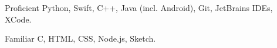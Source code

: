 
\begin{cvskills}

	\cvskill
	{Proficient} %
	{Python, Swift, C++, Java (incl. Android), Git, JetBrains IDEs, XCode.} %

	\cvskill
	{Familiar\hphantom{9} } %
	{C, HTML, CSS, Node.js, Sketch.} %


    

\end{cvskills}
